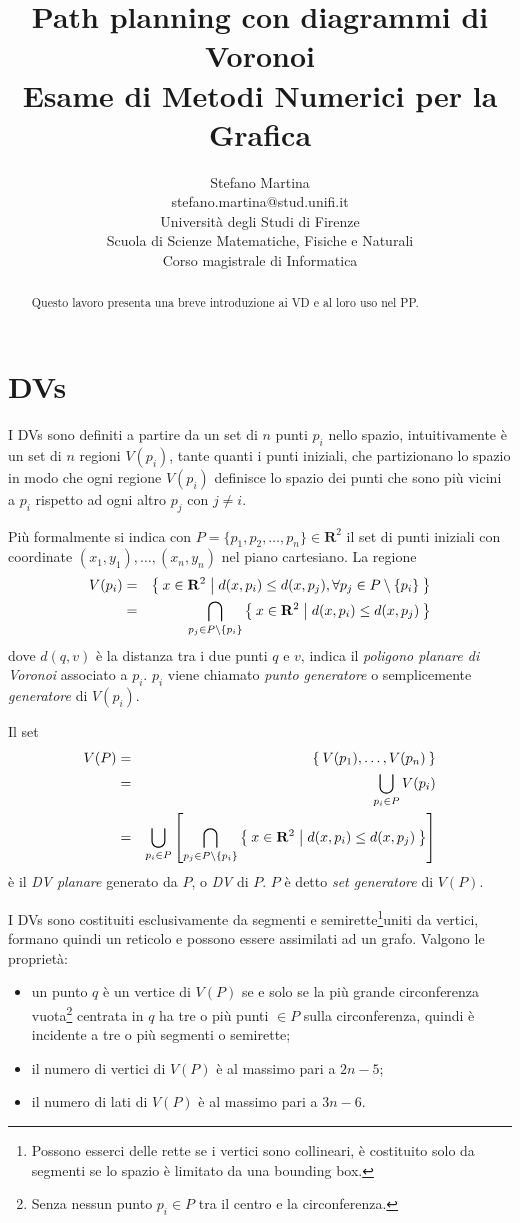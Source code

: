 \documentclass[a4paper,oneside]{article}
\author{
  {\Large Stefano Martina}\\
  {\small stefano.martina@stud.unifi.it}\\
  Universit\`a degli Studi di Firenze\\
  Scuola di Scienze Matematiche, Fisiche e Naturali\\
  Corso magistrale di Informatica
}
\title{{\Huge\bfseries Path planning con diagrammi di Voronoi}\\{\large\bfseries
    Esame di Metodi Numerici per la Grafica}}
\newcommand{\mr}{\ensuremath{\mathbf{R}}}
\begin{document}
\maketitle
\thispagestyle{empty}
\vfill
\begin{abstract}
  Questo lavoro presenta una breve introduzione ai \acf{VD} e al loro
  uso nel \acf{PP}.
\end{abstract}
\clearpage
\acresetall

\section*{\aclp{DV}}
I \acfp{DV} sono definiti a partire da un set di $n$ punti $p_i$ nello spazio,
intuitivamente \`e un set di $n$ regioni $V(p_i)$, tante quanti i punti
iniziali, che partizionano lo spazio in
modo che ogni regione $V(p_i)$ definisce lo spazio dei punti che sono
pi\`u vicini a $p_i$ rispetto ad ogni altro $p_j$ con $j\ne i$.

Pi\`u formalmente si indica con $P=\{p_1,p_2,\dots,p_n\}\in\mr^2$ il
set di punti iniziali con coordinate $(x_1, y_1),\dots,(x_n,y_n)$ nel
piano cartesiano. La regione
\begin{eqnarray*}
  V(p_i) &=& \Set{ x\in\mr^2 | d(x,p_i)\le d(x,p_j), \forall p_j\in
    P\setminus\{p_i\}} \\
  &=& \bigcap_{p_j\in P\setminus\{p_i\}}\Set{ x\in\mr^2 | d(x,p_i)\le d(x,p_j)}
\end{eqnarray*}
dove $d(q,v)$ \`e la distanza tra i due punti $q$ e $v$,
indica il \emph{poligono planare di Voronoi} associato a $p_i$. $p_i$
viene chiamato \emph{punto generatore} o semplicemente
\emph{generatore} di $V(p_i)$.

Il set
\begin{eqnarray*}
 V(P) &=& \Set{ V(p_1),\dots,V(p_n)}\\
 &=&\bigcup_{p_i\in P}V(p_i)\\
 &=&\bigcup_{p_i\in P}\left[\bigcap_{p_j\in P\setminus\{p_i\}}\Set{ x\in\mr^2 | d(x,p_i)\le d(x,p_j)}\right]
\end{eqnarray*}
\`e il \emph{\acl{DV} planare} generato da $P$, o
\emph{\acl{DV}}
di $P$. $P$ \`e detto \emph{set generatore} di $V(P)$.

I \acp{DV} sono costituiti esclusivamente da segmenti e
semirette\footnote{Possono esserci delle rette se i vertici sono
  collineari, \`e costituito solo da segmenti se
  lo spazio \`e limitato da una bounding box.}uniti da
vertici, formano quindi un reticolo e possono essere assimilati ad un
grafo. Valgono le propriet\`a:
\begin{itemize}
\item un punto $q$ \`e un vertice di $V(P)$ se e solo se la pi\`u grande
  circonferenza vuota\footnote{Senza nessun punto $p_i\in P$ tra il
    centro e la circonferenza.} centrata in $q$ ha tre o pi\`u punti
  $\in P$ sulla circonferenza, quindi \`e incidente a tre o pi\`u
  segmenti o semirette;
\item il numero di vertici di $V(P)$ \`e al massimo pari a $2n-5$;
\item il numero di lati di $V(P)$ \`e al massimo pari a $3n-6$.
\end{itemize}
\end{document}

